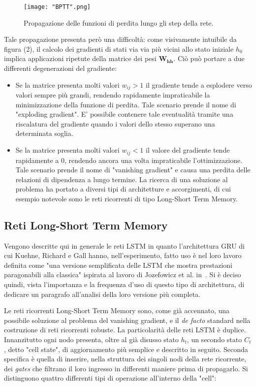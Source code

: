 \documentclass[10pt,letterpaper]{article}
\begin{document}
\begin{figure}[h!]
	\centering
	\texttt{[image: "BPTT".png]}
	\caption{Propagazione delle funzioni di perdita lungo gli step della rete.}
	\label{fig:screen2}
\end{figure}

Tale propagazione presenta però una difficoltà: come visivamente intuibile da figura (2), il calcolo dei gradienti di stati via via più vicini allo stato iniziale $h_0$ implica applicazioni ripetute della matrice dei pesi $\textbf{W}_{\textbf{hh}}$. Ciò può portare a due differenti degenerazioni del gradiente:

\begin{itemize}
\item Se la matrice presenta molti valori $w_{ij} > 1$ il gradiente tende a esplodere verso valori sempre più grandi, rendendo rapidamente impraticabile la minimizzazione della funzione di perdita. Tale scenario prende il nome di "exploding gradient". E' possibile contenere tale eventualità tramite una riscalatura del gradiente quando i valori dello stesso superano una determinata soglia.
\item Se la matrice presenta molti valori $w_{ij} < 1$ il valore del gradiente tende rapidamente a 0, rendendo ancora una volta impraticabile l'ottimizzazione. Tale scenario prende il nome di "vanishing gradient" e causa una perdita delle relazioni di dipendenza a lungo termine. La ricerca di una soluzione al problema ha portato a diversi tipi di architetture e accorgimenti, di cui esempio notevole sono le reti ricorrenti di tipo Long-Short Term Memory.
\end{itemize}

\subsection{Reti Long-Short Term Memory}
Vengono descritte qui in generale le reti LSTM in quanto l'architettura GRU di cui Kuehne, Richard e Gall hanno, nell'esperimento, fatto uso è nel loro lavoro definita come "una versione semplificata delle LSTM che mostra prestazioni paragonabili alla classica" ispirata al lavoro di Jozefowicz et al. in~\cite{bib4}. Si è deciso quindi, vista l'importanza e la frequenza d'uso di questo tipo di architettura, di dedicare un paragrafo all'analisi della loro versione più completa.

Le reti ricorrenti Long-Short Term Memory sono, come già accennato, una possibile soluzione al problema del vanishing gradient, e il \textit{de facto} standard nella costruzione di reti ricorrenti robuste. La particolarità delle reti LSTM è duplice. Innanzitutto ogni nodo presenta, oltre al già disusso stato $h_t$, un secondo stato $C_t$, detto "cell state", di aggiornamento più semplice e descritto in seguito. Seconda specifica è quella di inserire, nella struttura dei singoli nodi della rete ricorrente, dei \textit{gates} che filtrano il loro ingresso in differenti maniere prima di propagarlo. Si distinguono quattro differenti tipi di operazione all'interno della "cell":
\end{document}
